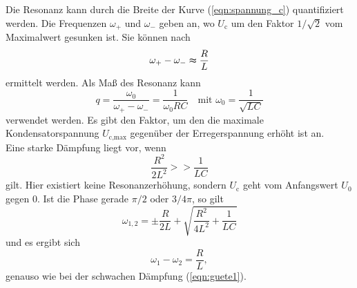 Die Resonanz kann durch die Breite der Kurve (\autoref{eqn:spannung_c}) quantifiziert werden.
Die Frequenzen $\omega_+$ und $\omega_-$ geben an, wo $U_\text{c}$ um den Faktor $1/\sqrt{2}$ vom Maximalwert gesunken ist.
Sie können nach
\begin{equation}
    \omega_+ - \omega_- \thickapprox \frac{R}{L}
    \label{eqn:guete1}
\end{equation}
ermittelt werden. Als Maß des Resonanz kann 
\begin{equation}
    q = \frac{\omega_0}{\omega_+ - \omega_-} = \frac{1}{\omega_0RC} \quad \text{mit } \omega_0 = \frac{1}{\sqrt{LC}}
\end{equation}
verwendet werden. Es gibt den Faktor, um den die maximale Kondensatorspannung $U_\text{c,max}$ gegenüber der Erregerspannung erhöht ist an.
\\
Eine starke Dämpfung liegt vor, wenn
\begin{equation*}
    \frac{R^2}{2L^2} >> \frac{1}{LC}
\end{equation*}
gilt. Hier existiert keine Resonanzerhöhung, sondern $U_\text{c}$ geht vom Anfangswert $U_0$ gegen 0.
Ist die Phase gerade $\pi/2$ oder $3/4 \pi$, so gilt
\begin{equation}
    \omega_{1,2} = \pm \frac{R}{2L} + \sqrt{\frac{R^2}{4L^2} + \frac{1}{LC}} 
\end{equation}
und es ergibt sich
\begin{equation}
    \omega_1 - \omega_2 = \frac{R}{L} ,
    \label{eqn:breite}
\end{equation}
genauso wie bei der schwachen Dämpfung (\autoref{eqn:guete1}).